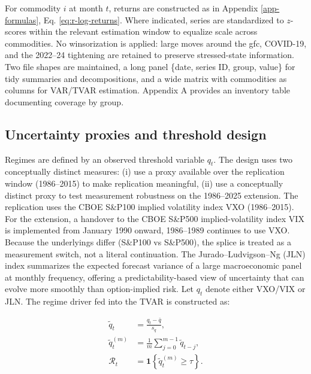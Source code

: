 \documentclass[
  11pt,
]{article}
\begin{document}
For commodity \(i\) at month \(t\), returns are constructed as in Appendix \ref{app-formulas}, Eq. \eqref{eq:r-log-returns}.
Where indicated, series are standardized to \(z\)-scores within the relevant estimation window to equalize scale across commodities. No winsorization is applied: large moves around the \ac{gfc}, COVID-19, and the 2022--24 tightening are retained to preserve stressed-state information. Two file shapes are maintained, a long panel \{date, series ID, group, value\} for tidy summaries and decompositions, and a wide matrix with commodities as columns for VAR/TVAR estimation. Appendix A provides an inventory table documenting coverage by group.

\subsection{Uncertainty proxies and threshold design}\label{sec:datatwo}

Regimes are defined by an observed threshold variable \(q_t\). The design uses two conceptually distinct measures: (i) use a proxy available over the replication window (1986--2015) to make replication meaningful, (ii) use a conceptually distinct proxy to test measurement robustness on the 1986--2025 extension.
The replication uses the CBOE S\&P100 implied volatility index VXO (1986--2015). For the extension, a handover to the CBOE S\&P500 implied-volatility index VIX is implemented from January 1990 onward, 1986--1989 continues to use VXO. Because the underlyings differ (S\&P100 vs S\&P500), the splice is treated as a measurement switch, not a literal continuation. The Jurado--Ludvigson--Ng (JLN) index summarizes the expected forecast variance of a large macroeconomic panel at monthly frequency, offering a predictability-based view of uncertainty that can evolve more smoothly than option-implied risk.
Let \(q_t\) denote either VXO/VIX or JLN. The regime driver fed into the TVAR is constructed as:

\begin{subequations}\label{eq:tilde-q}
\begin{align}
\tilde{q}_t &= \frac{q_t - \bar{q}}{s_q}, \label{eq:tilde-q-level}\\
\tilde{q}_t^{(m)} &= \frac{1}{m}\sum_{j=0}^{m-1}\tilde{q}_{t-j}, \label{eq:tilde-q-smooth}\\
\mathcal{R}_t &= \mathbf{1}\!\left\{ \tilde{q}_t^{(m)} \ge \tau \right\}. \label{eq:tilde-q-regime}
\end{align}
\end{subequations}
\end{document}
